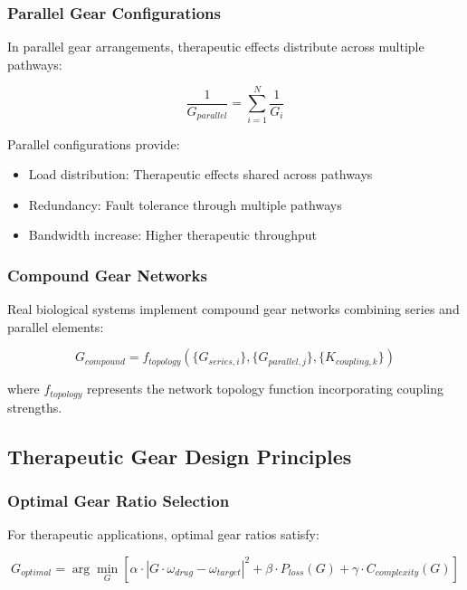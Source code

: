 \documentclass[12pt,a4paper]{article}
\begin{document}
\subsubsection{Parallel Gear Configurations}

In parallel gear arrangements, therapeutic effects distribute across multiple pathways:

\begin{equation}
\frac{1}{G_{parallel}} = \sum_{i=1}^{N} \frac{1}{G_i}
\end{equation}

Parallel configurations provide:
\begin{itemize}
\item Load distribution: Therapeutic effects shared across pathways
\item Redundancy: Fault tolerance through multiple pathways
\item Bandwidth increase: Higher therapeutic throughput
\end{itemize}

\subsubsection{Compound Gear Networks}

Real biological systems implement compound gear networks combining series and parallel elements:

\begin{equation}
G_{compound} = f_{topology}(\{G_{series,i}\}, \{G_{parallel,j}\}, \{K_{coupling,k}\})
\end{equation}

where $f_{topology}$ represents the network topology function incorporating coupling strengths.

\subsection{Therapeutic Gear Design Principles}

\subsubsection{Optimal Gear Ratio Selection}

For therapeutic applications, optimal gear ratios satisfy:

\begin{equation}
G_{optimal} = \arg\min_{G} \left[\alpha \cdot |G \cdot \omega_{drug} - \omega_{target}|^2 + \beta \cdot P_{loss}(G) + \gamma \cdot C_{complexity}(G)\right]
\end{equation}
\end{document}
